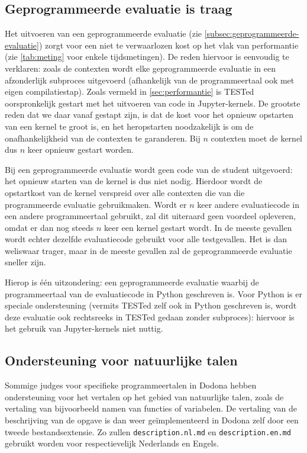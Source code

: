 \subsection{Geprogrammeerde evaluatie is traag}\label{subsec:geprogrammeerde-evaluatie-is-traag}

Het uitvoeren van een geprogrammeerde evaluatie (zie \cref{subsec:geprogrammeerde-evaluatie}) zorgt voor een niet te verwaarlozen kost op het vlak van performantie (zie \cref{tab:meting} voor enkele tijdsmetingen).
De reden hiervoor is eenvoudig te verklaren: zoals de contexten wordt elke geprogrammeerde evaluatie in een afzonderlijk subproces uitgevoerd (afhankelijk van de programmeertaal ook met eigen compilatiestap).
Zoals vermeld in \cref{sec:performantie} is TESTed oorspronkelijk gestart met het uitvoeren van code in Jupyter-kernels.
De grootste reden dat we daar vanaf gestapt zijn, is dat de kost voor het opnieuw opstarten van een kernel te groot is, en het heropstarten noodzakelijk is om de onafhankelijkheid van de contexten te garanderen.
Bij $n$ contexten moet de kernel dus $n$ keer opnieuw gestart worden.

Bij een geprogrammeerde evaluatie wordt geen code van de student uitgevoerd: het opnieuw starten van de kernel is dus niet nodig.
Hierdoor wordt de opstartkost van de kernel verspreid over alle contexten die van die programmeerde evaluatie gebruikmaken.
Wordt er $n$ keer andere evaluatiecode in een andere programmeertaal gebruikt, zal dit uiteraard geen voordeel opleveren, omdat er dan nog steeds $n$ keer een kernel gestart wordt.
In de meeste gevallen wordt echter dezelfde evaluatiecode gebruikt voor alle testgevallen.
Het  is dan weliswaar trager, maar in de meeste gevallen zal de geprogrammeerde evaluatie sneller zijn.

Hierop is één uitzondering: een geprogrammeerde evaluatie waarbij de programmeertaal van de evaluatiecode in Python geschreven is.
Voor Python is er speciale ondersteuning (vermits TESTed zelf ook in Python geschreven is, wordt deze evaluatie ook rechtsreeks in TESTed gedaan zonder subproces): hiervoor is het gebruik van Jupyter-kernels niet nuttig.

\subsection{Ondersteuning voor natuurlijke talen}\label{subsec:ondersteuning-voor-natuurlijke-talen}

Sommige judges voor specifieke programmeertalen in Dodona hebben ondersteuning voor het vertalen op het gebied van natuurlijke talen, zoals de vertaling van bijvoorbeeld namen van functies of variabelen.
De vertaling van de beschrijving van de opgave is dan weer geïmplementeerd in Dodona zelf door een tweede bestandsextensie.
Zo zullen \texttt{description.nl.md} en \texttt{description.en.md} gebruikt worden voor respectievelijk Nederlands en Engels.


